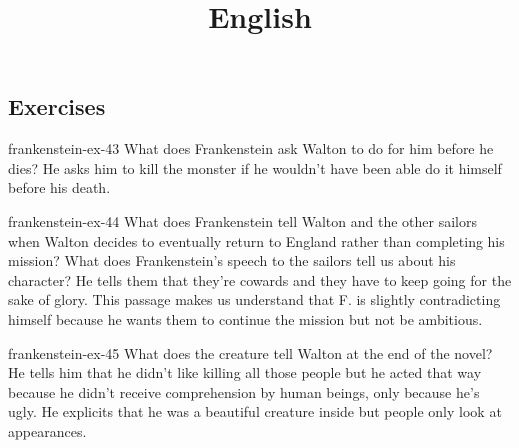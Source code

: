 \documentclass[preview]{standalone}
\begin{document}
\title{English}
\genpage


\subsection{Exercises}

\begin{snippetexercise}{frankenstein-ex-43}
    {What does Frankenstein ask Walton to do for him before he dies?}
    He asks him to kill the monster if he wouldn't have been able 
    do it himself before his death. 
\end{snippetexercise}

\begin{snippetexercise}{frankenstein-ex-44}
    {What does Frankenstein tell Walton and the other sailors when Walton decides to eventually
    return to England rather than completing his mission? What does Frankenstein's speech to the
    sailors tell us about his character?}
    He tells them that they're cowards and they have to keep going for the sake
    of glory. This passage makes us understand that F. is slightly contradicting himself
    because he wants them to continue the mission but not be ambitious.
\end{snippetexercise}

\begin{snippetexercise}{frankenstein-ex-45}
    {What does the creature tell Walton at the end of the novel?}
    He tells him that he didn't like killing all those people but he acted that
    way because he didn't receive comprehension by human beings, only because
    he's ugly. He explicits that he was a beautiful creature inside but people only look
    at appearances.
\end{snippetexercise}
\end{document}

